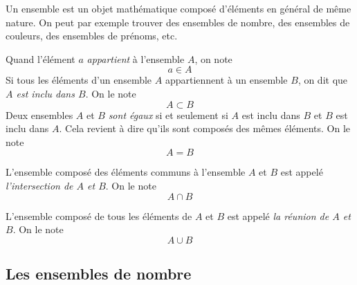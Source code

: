 Un ensemble est un objet mathématique composé d'éléments en général de même nature. On peut par exemple trouver des ensembles de nombre, des ensembles de couleurs, des ensembles de prénoms, etc.

Quand l'élément $a$ \emph{appartient} à l'ensemble $A$, on note
$$
a\in A
$$
Si tous les éléments d'un ensemble $A$ appartiennent à un ensemble $B$, on dit que \emph{$A$ est inclu dans $B$}. On le note
$$
A \subset B
$$
Deux ensembles $A$ et $B$ \emph{sont égaux} si et seulement si $A$ est inclu dans $B$ et $B$ est inclu dans $A$. Cela revient à dire qu'ils sont composés des mêmes éléments. On le note 
$$
A=B
$$

L'ensemble composé des éléments communs à l'ensemble $A$ et $B$ est appelé \emph{l'intersection de $A$ et $B$}. On le note
$$
A\cap B
$$

L'ensemble composé de tous les éléments de $A$ et $B$ est appelé \emph{la réunion de $A$ et $B$}. On le note
$$
A\cup B
$$

\subsection{Les ensembles de nombre}

